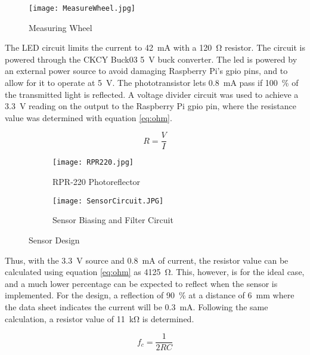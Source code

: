 \begin{figure}[H]
	\begin{center}
		\texttt{[image: MeasureWheel.jpg]}
		\caption{Measuring Wheel}
		\label{fig:measwheel}
	\end{center}
\end{figure}

The LED circuit limits the current to \SI{42}{\milli\ampere} with a \SI{120}{\ohm} resistor. The circuit is powered through the CKCY Buck03 \SI{5}{\volt} buck converter. The \acs{led} is powered by an external power source to avoid damaging Raspberry Pi's \acs{gpio} pins, and to allow for it to operate at \SI{5}{\volt}. The phototransistor lets \SI{0.8}{\milli\ampere} pass if \SI{100}{\percent} of the transmitted light is reflected. A voltage divider circuit was used to achieve a \SI{3.3}{\volt} reading on the output to the Raspberry Pi \ac{gpio} pin, where the resistance value was determined with equation \ref{eq:ohm}. 

\begin{equation}
	R = \frac{V}{I}
	\label{eq:ohm}
\end{equation}

\begin{figure}[H]
	\centering
	\begin{subfigure}[t]{.315\textwidth}
		\centering
		\texttt{[image: RPR220.jpg]}
		\caption{RPR-220 Photoreflector}
		\citep{RPR:2015}
		\label{fig:rpr}
	\end{subfigure}
	\begin{subfigure}[t]{.65\textwidth}
		\centering
		\texttt{[image: SensorCircuit.JPG]}
		\caption{Sensor Biasing and Filter Circuit}
		\label{fig:sensorD}
	\end{subfigure}
	\caption{Sensor Design}
	\label{fig:Sensor}
\end{figure}

Thus, with the \SI{3.3}{\volt} source and \SI{0.8}{\milli\ampere} of current, the resistor value can be calculated using equation \ref{eq:ohm} as \SI{4125}{\ohm}. This, however, is for the ideal case, and a much lower percentage can be expected to reflect when the sensor is implemented. For the design, a reflection of \SI{90}{\percent} at a distance of \SI{6}{\milli\meter} where the data sheet indicates the current will be \SI{0.3}{\milli\ampere}. Following the same calculation, a resistor value of \SI{11}{\kilo\ohm} is determined.

\begin{equation}
	f_c = \frac{1}{2 R C}
\end{equation}

